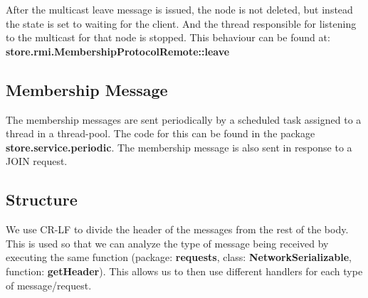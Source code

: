 After the multicast leave message is issued, the node is not deleted, but instead the state is set to waiting for the client. And the thread responsible for listening to the multicast for that node is stopped. This behaviour can be found at: \textbf{store.rmi.MembershipProtocolRemote::leave}


\subsection{Membership Message}

The membership messages are sent periodically by a scheduled task assigned to a thread in a thread-pool. The code for this can be found in the package \textbf{store.service.periodic}. 
The membership message is also sent in response to a JOIN request.

\subsection{Structure}

We use CR-LF to divide the header of the messages from the rest of the body. This is used so that we can analyze the type of message being received by executing the same function (package: \textbf{requests}, class: \textbf{NetworkSerializable}, function: \textbf{getHeader}). This allows us to then use different handlers for each type of message/request.

